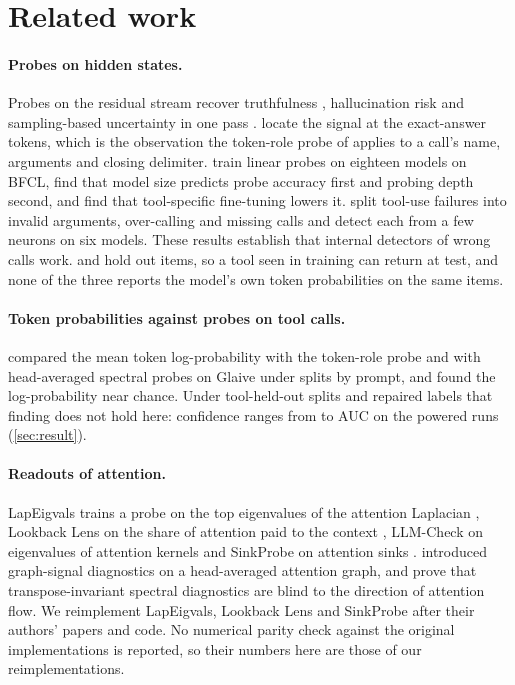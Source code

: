 \section{Related work}
\label{sec:related}

\paragraph{Probes on hidden states.}
Probes on the residual stream recover truthfulness \citep{azaria2023internal,marks2024geometry}, hallucination risk \citep{ji2024internal} and sampling-based uncertainty in one pass \citep{kossen2024sep}. \citet{orgad2025know} locate the signal at the exact-answer tokens, which is the observation the token-role probe of \citet{healy2026internal} applies to a call's name, arguments and closing delimiter. \citet{yeats2026calls} train linear probes on eighteen models on BFCL, find that model size predicts probe accuracy first and probing depth second, and find that tool-specific fine-tuning lowers it. \citet{ke2026neurons} split tool-use failures into invalid arguments, over-calling and missing calls and detect each from a few neurons on six models. These results establish that internal detectors of wrong calls work. \citet{healy2026internal} and \citet{yeats2026calls} hold out items, so a tool seen in training can return at test, and none of the three reports the model's own token probabilities on the same items.

\paragraph{Token probabilities against probes on tool calls.}
\wscitet{} compared the mean token log-probability with the token-role probe and with head-averaged spectral probes on Glaive under splits by prompt, and found the log-probability near chance. Under tool-held-out splits and repaired labels that finding does not hold here: confidence ranges from \confMinPowered{} to \confMaxPowered{} AUC on the powered runs (\cref{sec:result}).

\paragraph{Readouts of attention.}
LapEigvals trains a probe on the top eigenvalues of the attention Laplacian \citep{binkowski2025lapeigvals}, Lookback Lens on the share of attention paid to the context \citep{chuang2024lookback}, LLM-Check on eigenvalues of attention kernels \citep{sriramanan2024llmcheck} and SinkProbe on attention sinks \citep{binkowski2026sinks}. \citet{noel2025gsp} introduced graph-signal diagnostics on a head-averaged attention graph, and \citet{dahlem2026transport} prove that transpose-invariant spectral diagnostics are blind to the direction of attention flow. We reimplement LapEigvals, Lookback Lens and SinkProbe after their authors' papers and code. No numerical parity check against the original implementations is reported, so their numbers here are those of our reimplementations.

